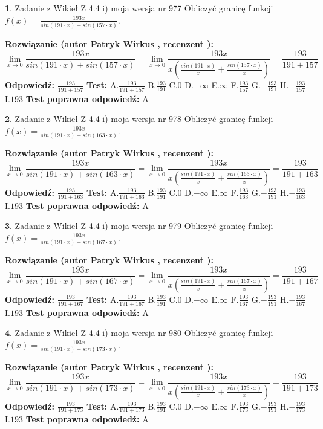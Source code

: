 \documentclass[12pt, a4paper]{article}
\theoremstyle{definition} %
\newtheorem{zad}{}
\newcommand{\zadStart}[1]{\begin{zad}#1\newline}
\newcommand{\zadStop}{\end{zad}}
\newcommand{\rozwStart}[2]{\noindent \textbf{Rozwiązanie (autor #1 , recenzent #2): }\newline}
\newcommand{\rozwStop}{\newline}
\newcommand{\odpStart}{\noindent \textbf{Odpowiedź:}\newline}
\newcommand{\odpStop}{\newline}
\newcommand{\testStart}{\noindent \textbf{Test:}\newline}
\newcommand{\testStop}{\newline}
\newcommand{\kluczStart}{\noindent \textbf{Test poprawna odpowiedź:}\newline}
\newcommand{\kluczStop}{\newline}
\begin{document}
\zadStart{Zadanie z Wikieł Z 4.4 i) moja wersja nr 977}
Obliczyć granicę funkcji $f(x)=\frac{193x}{sin(191\cdot x) +sin(157\cdot x)}$.
\zadStop
\rozwStart{Patryk Wirkus}{}
$$\lim\limits_{x\to 0}\frac{193x}{sin(191\cdot x) +sin(157\cdot x)}=\lim\limits_{x\to 0}\frac{193x}{x(\frac{sin(191\cdot x)}{x}+\frac{sin(157\cdot x)}{x})}=\frac{193}{191+157}$$
\rozwStop
\odpStart
$\frac{193}{191+157}$
\odpStop
\testStart
A.$\frac{193}{191+157}$
B.$\frac{193}{191}$
C.$0$
D.$-\infty$
E.$\infty$
F.$\frac{193}{157}$
G.$-\frac{193}{191}$
H.$-\frac{193}{157}$
I.$193$
\testStop
\kluczStart
A
\kluczStop



\zadStart{Zadanie z Wikieł Z 4.4 i) moja wersja nr 978}
Obliczyć granicę funkcji $f(x)=\frac{193x}{sin(191\cdot x) +sin(163\cdot x)}$.
\zadStop
\rozwStart{Patryk Wirkus}{}
$$\lim\limits_{x\to 0}\frac{193x}{sin(191\cdot x) +sin(163\cdot x)}=\lim\limits_{x\to 0}\frac{193x}{x(\frac{sin(191\cdot x)}{x}+\frac{sin(163\cdot x)}{x})}=\frac{193}{191+163}$$
\rozwStop
\odpStart
$\frac{193}{191+163}$
\odpStop
\testStart
A.$\frac{193}{191+163}$
B.$\frac{193}{191}$
C.$0$
D.$-\infty$
E.$\infty$
F.$\frac{193}{163}$
G.$-\frac{193}{191}$
H.$-\frac{193}{163}$
I.$193$
\testStop
\kluczStart
A
\kluczStop



\zadStart{Zadanie z Wikieł Z 4.4 i) moja wersja nr 979}
Obliczyć granicę funkcji $f(x)=\frac{193x}{sin(191\cdot x) +sin(167\cdot x)}$.
\zadStop
\rozwStart{Patryk Wirkus}{}
$$\lim\limits_{x\to 0}\frac{193x}{sin(191\cdot x) +sin(167\cdot x)}=\lim\limits_{x\to 0}\frac{193x}{x(\frac{sin(191\cdot x)}{x}+\frac{sin(167\cdot x)}{x})}=\frac{193}{191+167}$$
\rozwStop
\odpStart
$\frac{193}{191+167}$
\odpStop
\testStart
A.$\frac{193}{191+167}$
B.$\frac{193}{191}$
C.$0$
D.$-\infty$
E.$\infty$
F.$\frac{193}{167}$
G.$-\frac{193}{191}$
H.$-\frac{193}{167}$
I.$193$
\testStop
\kluczStart
A
\kluczStop



\zadStart{Zadanie z Wikieł Z 4.4 i) moja wersja nr 980}
Obliczyć granicę funkcji $f(x)=\frac{193x}{sin(191\cdot x) +sin(173\cdot x)}$.
\zadStop
\rozwStart{Patryk Wirkus}{}
$$\lim\limits_{x\to 0}\frac{193x}{sin(191\cdot x) +sin(173\cdot x)}=\lim\limits_{x\to 0}\frac{193x}{x(\frac{sin(191\cdot x)}{x}+\frac{sin(173\cdot x)}{x})}=\frac{193}{191+173}$$
\rozwStop
\odpStart
$\frac{193}{191+173}$
\odpStop
\testStart
A.$\frac{193}{191+173}$
B.$\frac{193}{191}$
C.$0$
D.$-\infty$
E.$\infty$
F.$\frac{193}{173}$
G.$-\frac{193}{191}$
H.$-\frac{193}{173}$
I.$193$
\testStop
\kluczStart
A
\kluczStop
\end{document}
